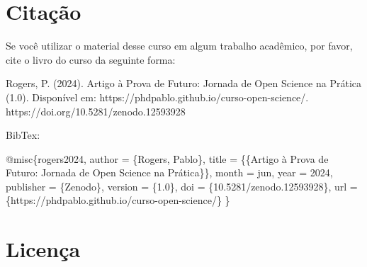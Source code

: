 \documentclass[
  a4paper,
]{book}
\newenvironment{Shaded}{\begin{snugshade}}{\end{snugshade}}
\newcommand{\DecValTok}[1]{\textcolor[rgb]{0.68,0.00,0.00}{#1}}
\newcommand{\ErrorTok}[1]{\textcolor[rgb]{0.68,0.00,0.00}{#1}}
\newcommand{\FloatTok}[1]{\textcolor[rgb]{0.68,0.00,0.00}{#1}}
\newcommand{\NormalTok}[1]{\textcolor[rgb]{0.00,0.23,0.31}{#1}}
\newcommand{\OtherTok}[1]{\textcolor[rgb]{0.00,0.23,0.31}{#1}}
\newcommand{\SpecialCharTok}[1]{\textcolor[rgb]{0.37,0.37,0.37}{#1}}
\begin{document}
\newpage

\section*{Citação}\label{sec-cite}


Se você utilizar o material desse curso em algum trabalho acadêmico, por
favor, cite o livro do curso da seguinte forma:

\begin{tcolorbox}[enhanced jigsaw, breakable, opacityback=0, left=2mm, toprule=.15mm, colback=white, colframe=quarto-callout-important-color-frame, bottomrule=.15mm, arc=.35mm, rightrule=.15mm, leftrule=.75mm]

Rogers, P. (2024). Artigo à Prova de Futuro: Jornada de Open Science na
Prática (1.0). Disponível em:
https://phdpablo.github.io/curso-open-science/.
https://doi.org/10.5281/zenodo.12593928

\end{tcolorbox}

BibTex:

\begin{Shaded}
\begin{Highlighting}[]
\SpecialCharTok{@}\NormalTok{misc\{rogers2024,}
\NormalTok{  author       }\OtherTok{=}\NormalTok{ \{Rogers, Pablo\},}
\NormalTok{  title        }\OtherTok{=}\NormalTok{ \{\{Artigo à Prova de Futuro}\SpecialCharTok{:}\NormalTok{ Jornada de Open Science }
\NormalTok{                   na Prática\}\},}
\NormalTok{  month        }\OtherTok{=}\NormalTok{ jun,}
\NormalTok{  year         }\OtherTok{=} \DecValTok{2024}\NormalTok{,}
\NormalTok{  publisher    }\OtherTok{=}\NormalTok{ \{Zenodo\},}
\NormalTok{  version      }\OtherTok{=}\NormalTok{ \{}\FloatTok{1.0}\NormalTok{\},}
\NormalTok{  doi          }\OtherTok{=}\NormalTok{ \{}\FloatTok{10.5281}\SpecialCharTok{/}\NormalTok{zenodo}\FloatTok{.12593928}\NormalTok{\},}
\NormalTok{  url          }\OtherTok{=}\NormalTok{ \{https}\SpecialCharTok{:}\ErrorTok{//}\NormalTok{phdpablo.github.io}\SpecialCharTok{/}\NormalTok{curso}\SpecialCharTok{{-}}\NormalTok{open}\SpecialCharTok{{-}}\NormalTok{science}\SpecialCharTok{/}\NormalTok{\}}
\NormalTok{\}}
\end{Highlighting}
\end{Shaded}

\section*{Licença}\label{licenuxe7a}
\end{document}
